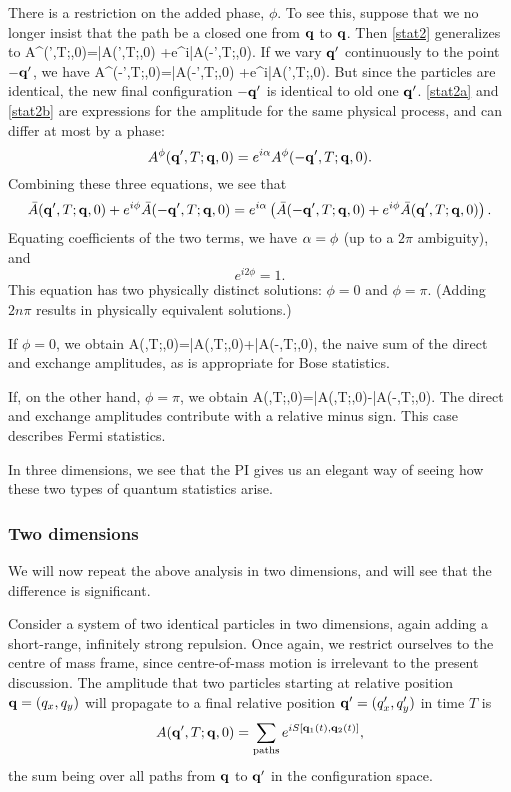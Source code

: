 \documentclass[12pt]{article}
\begin{document}
There is a restriction on the added
phase, $\phi$. To see this, suppose that
we no longer insist that the path be a closed one from ${\mathbf q}$ to
${\mathbf q}$. Then \eqref{stat2} generalizes to
\beq A^\phi(\bfq',T;\bfq,0)=\bar A(\bfq',T;\bfq,0)
+e^{i\phi}\bar A(-\bfq',T;\bfq,0).
\label{stat2a}
\eeq
If we vary ${\mathbf q}'$ continuously to the point $-{\mathbf q}'$, we have
\beq
A^\phi(-\bfq',T;\bfq,0)=\bar A(-\bfq',T;\bfq,0)
+e^{i\phi}\bar A(\bfq',T;\bfq,0).
\label{stat2b}
\eeq
But since the particles are identical,
the new final configuration $-{\mathbf q}'$ is identical to old one ${\mathbf q}'$.
\eqref{stat2a} and \eqref{stat2b} are expressions for the amplitude for
the same physical process, and can differ at most by a phase:
\[ A^\phi({\mathbf q}',T;{\mathbf q},0)=e^{i\alpha}A^\phi(-{\mathbf q}',T;{\mathbf q},0).
\]
Combining these three equations, we see that
\[
\bar A({\mathbf q}',T;{\mathbf q},0)+e^{i\phi}\bar A(-{\mathbf q}',T;{\mathbf q},0)
=e^{i\alpha}\left(
\bar A(-{\mathbf q}',T;{\mathbf q},0)+e^{i\phi}\bar A({\mathbf q}',T;{\mathbf q},0)\right).
\]
Equating coefficients of the two terms, we have $\alpha=\phi$ (up to a
$2\pi$ ambiguity), and
\[
e^{i2\phi}=1.
\]
This equation has two physically distinct solutions: $\phi=0$ and
$\phi=\pi$. (Adding $2n\pi$ results in physically equivalent
solutions.)

If $\phi=0$, we obtain
\beq
A(\bfq,T;\bfq,0)=\bar A(\bfq,T;\bfq,0)+\bar A(-\bfq,T;\bfq,0),
\label{stat3}
\eeq
the naive sum of the direct and exchange
amplitudes, as is appropriate for Bose statistics.

If, on the other hand, $\phi=\pi$, we obtain
\beq
A(\bfq,T;\bfq,0)=\bar A(\bfq,T;\bfq,0)-\bar A(-\bfq,T;\bfq,0).
\label{stat4}
\eeq
The direct and exchange amplitudes contribute with a relative minus
sign. This case describes Fermi statistics. 

In three dimensions, we see that the PI gives us an elegant way of
seeing how these two types of quantum statistics arise.

\subsubsection{Two dimensions}

We will now repeat the above analysis in two dimensions, and
will see that the difference is significant.

Consider a system of two identical particles in two dimensions, again
adding a short-range, infinitely strong repulsion.
Once again, we restrict
ourselves to the centre of mass frame, since centre-of-mass
motion is irrelevant to the present discussion.
The amplitude that two particles starting at relative position
${\mathbf q}=(q_x,q_y)$ will propagate to a final relative position
${\mathbf q}'=(q_x',q_y')$ in time $T$ is
\[ A({\mathbf q}',T;{\mathbf q},0)=\sum_{\mathrm{paths}}e^{iS[{\mathbf q}_1(t),{\mathbf q}_2(t)]},
\]
the sum being over all paths from ${\mathbf q}$ to ${\mathbf q}'$ in the
configuration space. 
\end{document}
